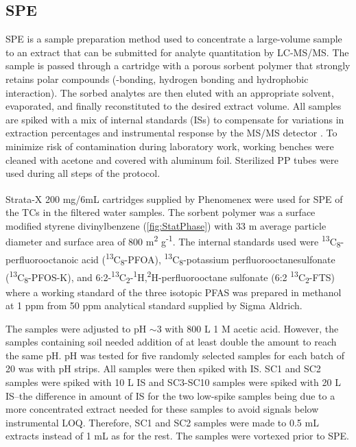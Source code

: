\subsection{SPE}
SPE is a sample preparation method used to concentrate a large-volume sample to an extract that can be submitted for analyte quantitation by LC-MS/MS. The sample is passed through a cartridge with a porous sorbent polymer that strongly retains polar compounds (\textpi-\textpi bonding, hydrogen bonding and hydrophobic interaction). The sorbed analytes are then eluted with an appropriate solvent, evaporated, and finally reconstituted to the desired extract volume. All samples are spiked with a mix of internal standards (ISs) to compensate for variations in extraction percentages and instrumental response by the MS/MS detector \citep{arvaniti2014}. To minimize risk of contamination during laboratory work, working benches were cleaned with acetone and covered with aluminum foil. Sterilized PP tubes were used during all steps of the protocol.

Strata-X\textsuperscript{\textregistered} 200 mg/6mL cartridges supplied by Phenomenex were used for SPE of the TCs in the filtered water samples. The sorbent polymer was a surface modified styrene divinylbenzene (\cref{fig:StatPhase}) with 33 \textmu m average particle diameter and surface area of 800 m\textsuperscript{2} g\textsuperscript{-1}. The internal standards used were \textsuperscript{13}C\textsubscript{8}-perfluorooctanoic acid  (\textsuperscript{13}C\textsubscript{8}-PFOA), \textsuperscript{13}C\textsubscript{8}-potassium perfluorooctanesulfonate (\textsuperscript{13}C\textsubscript{8}-PFOS-K), and 6:2-\textsuperscript{13}C\textsubscript{2}-\textsuperscript{1}H,\textsuperscript{2}H-perfluorooctane sulfonate  (6:2 \textsuperscript{13}C\textsubscript{2}-FTS) where a working standard of the three isotopic PFAS was prepared in methanol at 1 ppm from 50 ppm analytical standard supplied by Sigma Aldrich.

The samples were adjusted to pH $\sim$3 with 800 \textmu L 1 M acetic acid. However, the samples containing soil needed addition of at least double the amount to reach the same pH. pH was tested for five randomly selected samples for each batch of 20 was with pH strips. All samples were then spiked with IS. SC1 and SC2 samples were spiked with 10 \textmu L IS and SC3-SC10 samples were spiked with 20 \textmu L IS--the difference in amount of IS for the two low-spike samples being due to a more concentrated extract needed for these samples to avoid signals below instrumental LOQ. Therefore, SC1 and SC2 samples were made to 0.5 mL extracts instead of 1 mL as for the rest. The samples were vortexed prior to SPE.

